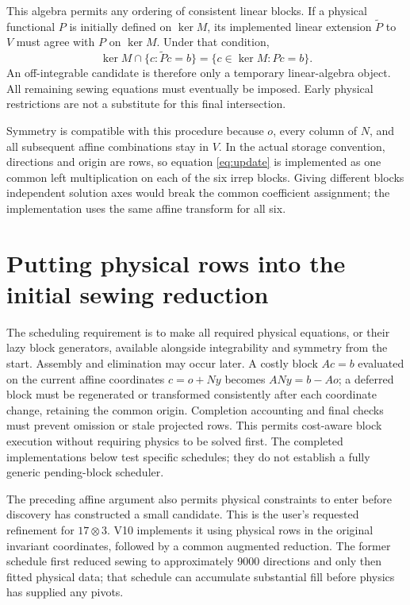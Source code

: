 \documentclass[11pt]{article}
\begin{document}
This algebra permits any ordering of consistent linear blocks. If a
physical functional $P$ is initially defined on $\ker M$, its implemented
linear extension $\widetilde P$ to $V$ must agree with $P$ on $\ker M$.
Under that condition,
\begin{equation}
 \ker M\cap\{c:\widetilde Pc=b\}
 =\{c\in\ker M:Pc=b\}.
\end{equation}
An off-integrable candidate is therefore only a temporary linear-algebra
object. All remaining sewing equations must eventually be imposed. Early
physical restrictions are not a substitute for this final intersection.

Symmetry is compatible with this procedure because $o$, every column of
$N$, and all subsequent affine combinations stay in $V$. In the actual
storage convention, directions and origin are rows, so equation
\eqref{eq:update} is implemented as one common left multiplication on each
of the six irrep blocks. Giving different blocks independent solution axes
would break the common coefficient assignment; the implementation uses the
same affine transform for all six.

\section{Putting physical rows into the initial sewing reduction}
The scheduling requirement is to make all required physical equations, or
their lazy block generators, available alongside integrability and symmetry
from the start. Assembly and elimination may occur later. A costly block
$Ac=b$ evaluated on the current affine coordinates $c=o+Ny$ becomes
$ANy=b-Ao$; a deferred block must be regenerated or transformed consistently
after each coordinate change, retaining the common origin. Completion
accounting and final checks must prevent omission or stale projected rows.
This permits cost-aware block execution without requiring physics to be
solved first. The completed implementations below test specific schedules;
they do not establish a fully generic pending-block scheduler.

The preceding affine argument also permits physical constraints to enter
before discovery has constructed a small candidate. This is the user's
requested refinement for $17\otimes3$. V10 implements it using physical
rows in the original invariant coordinates, followed by a common augmented
reduction. The former schedule first reduced sewing to approximately 9000
directions and only then fitted physical data; that schedule can accumulate
substantial fill before physics has supplied any pivots.
\end{document}
